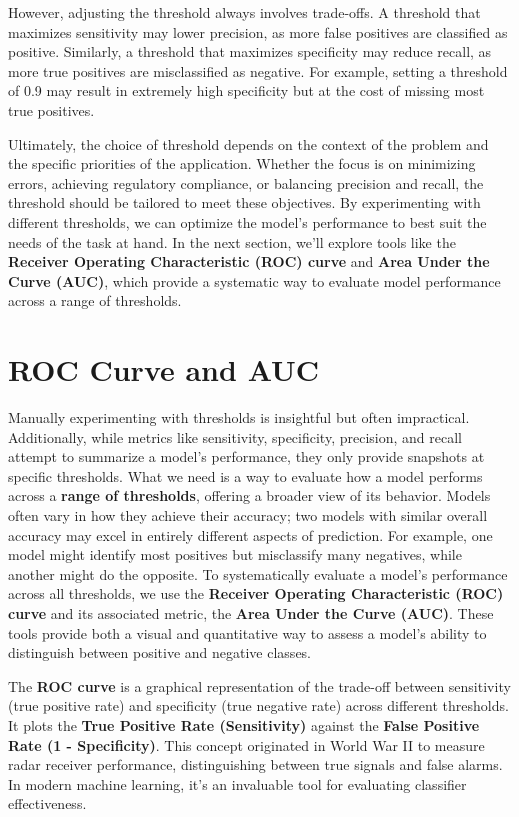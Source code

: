 \documentclass[
]{book}
\theoremstyle{definition}
\theoremstyle{definition}
\theoremstyle{definition}
\theoremstyle{definition}
\theoremstyle{remark}
\begin{document}
However, adjusting the threshold always involves trade-offs. A threshold that maximizes sensitivity may lower precision, as more false positives are classified as positive. Similarly, a threshold that maximizes specificity may reduce recall, as more true positives are misclassified as negative. For example, setting a threshold of 0.9 may result in extremely high specificity but at the cost of missing most true positives.

Ultimately, the choice of threshold depends on the context of the problem and the specific priorities of the application. Whether the focus is on minimizing errors, achieving regulatory compliance, or balancing precision and recall, the threshold should be tailored to meet these objectives. By experimenting with different thresholds, we can optimize the model's performance to best suit the needs of the task at hand. In the next section, we'll explore tools like the \textbf{Receiver Operating Characteristic (ROC) curve} and \textbf{Area Under the Curve (AUC)}, which provide a systematic way to evaluate model performance across a range of thresholds.

\section{ROC Curve and AUC}\label{roc-curve-and-auc}

Manually experimenting with thresholds is insightful but often impractical. Additionally, while metrics like sensitivity, specificity, precision, and recall attempt to summarize a model's performance, they only provide snapshots at specific thresholds. What we need is a way to evaluate how a model performs across a \textbf{range of thresholds}, offering a broader view of its behavior. Models often vary in how they achieve their accuracy; two models with similar overall accuracy may excel in entirely different aspects of prediction. For example, one model might identify most positives but misclassify many negatives, while another might do the opposite. To systematically evaluate a model's performance across all thresholds, we use the \textbf{Receiver Operating Characteristic (ROC) curve} and its associated metric, the \textbf{Area Under the Curve (AUC)}. These tools provide both a visual and quantitative way to assess a model's ability to distinguish between positive and negative classes.

The \textbf{ROC curve} is a graphical representation of the trade-off between sensitivity (true positive rate) and specificity (true negative rate) across different thresholds. It plots the \textbf{True Positive Rate (Sensitivity)} against the \textbf{False Positive Rate (1 - Specificity)}. This concept originated in World War II to measure radar receiver performance, distinguishing between true signals and false alarms. In modern machine learning, it's an invaluable tool for evaluating classifier effectiveness.
\end{document}
